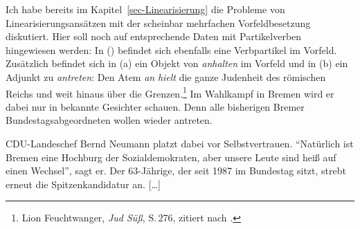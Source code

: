 Ich habe bereits im Kapitel~\ref{sec-Linearisierung} die Probleme von Linearisierungsansätzen
mit der scheinbar mehrfachen Vorfeldbesetzung diskutiert. Hier soll noch auf entsprechende
Daten mit Partikelverben hingewiesen werden: In () befindet sich ebenfalls
eine Verbpartikel im Vorfeld. Zusätzlich befindet sich \zb in (a)
ein Objekt von \emph{anhalten} im Vorfeld und in (b) ein Adjunkt zu \emph{antreten}:
\eal
\ex\label{bsp-den-atem-an-haelt}
Den Atem \emph{an} \emph{hielt} die ganze Judenheit des römischen Reichs und weit hinaus über die Grenzen.\footnote{
        Lion Feuchtwanger, \emph{Jud Süß}, S.\,276, zitiert nach .
}
\ex\label{bsp-wieder-an-tritt}
Im Wahlkampf in Bremen wird er dabei nur in bekannte Gesichter schauen. Denn alle bisherigen Bremer Bundestagsabgeordneten wollen wieder antreten.

CDU-Landeschef Bernd Neumann platzt dabei vor Selbstvertrauen. "`Natürlich ist Bremen eine Hochburg der Sozialdemokraten, aber unsere Leute sind heiß auf einen Wechsel"', sagt er. Der 63-Jährige, der seit 1987 im Bundestag sitzt, strebt erneut die Spitzenkandidatur an. [\ldots]

